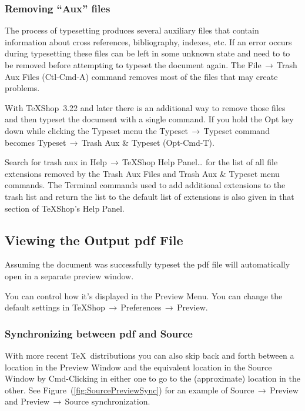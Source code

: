 \documentclass[letterpaper,11pt]{article}
\newcommand{\TS}{\textsf{\TeX Shop}}
\newcommand{\acr}[1]{\textsf{#1}}
\newcommand{\cmd}[1]{\textsf{#1}}
\newcommand{\mnu}[1]{\textsf{#1}}
\newcommand{\To}{\,\(\to\)\,}
\begin{document}
\subsubsection{Removing ``\cmd{Aux}'' files}

The process of typesetting produces several auxiliary files that contain information about cross references, bibliography, indexes, etc. If an error occurs during typesetting these files can be left in some unknown state and need to to be removed before attempting to typeset the document again. The \mnu{File}\To\mnu{Trash Aux Files} (\cmd{Ctl-Cmd-A}) command removes most of the files that may create problems.

With \TS\ 3.22 and later there is an additional way to remove those files and then typeset the document with a single command. If you hold the \cmd{Opt} key down while clicking the \mnu{Typeset} menu the \mnu{Typeset}\To\mnu{Typeset} command becomes \mnu{Typeset}\To\mnu{Trash Aux \& Typeset} (\cmd{Opt-Cmd-T}).

Search for \cmd{trash aux} in \mnu{Help}\To\mnu{TeXShop Help Panel…} for the list of all file extensions removed by the \mnu{Trash Aux Files} and \mnu{Trash Aux \& Typeset} menu commands. The \cmd{Terminal} commands used to add additional extensions to the trash list and return the list to the default list of extensions is also given in that section of \TS's Help Panel.

\subsection{Viewing the Output \acr{pdf} File}

Assuming the document was successfully typeset the \acr{pdf} file will automatically open in a separate preview window.

You can control how it's displayed in the \mnu{Preview} Menu. You can change the default settings in \mnu{TeXShop}\To\mnu{Preferences}\To\mnu{Preview}.

\subsubsection{Synchronizing between \acr{pdf} and Source}

With more recent \TeX\ distributions you can also skip back and forth between a location in the Preview Window and the equivalent location in the Source Window by \cmd{Cmd-Clicking} in either one to go to the (approximate) location in the other. See Figure~(\ref{fig:SourcePreviewSync}) for an example of Source\To Preview and Preview\To Source synchronization.
\end{document}
